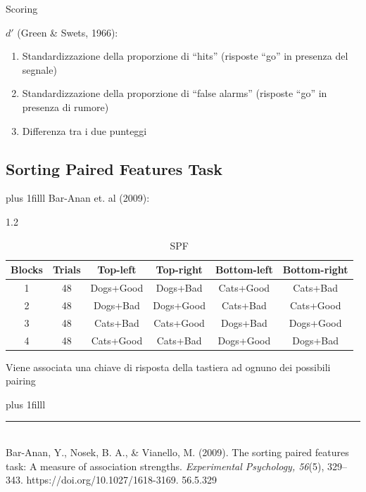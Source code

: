\documentclass[compress]{beamer}
\newcommand\Factor{1.2}
\begin{document}
\begin{frame}{Scoring}
	
$ d' $ (Green \& Swets, 1966): 

\vspace{5mm}

\begin{enumerate}
	\item Standardizzazione della proporzione di ``hits'' (risposte ``go'' in presenza del segnale)  
	\item Standardizzazione della proporzione di ``false alarms'' (risposte ``go'' in presenza di rumore)
	\item Differenza tra i due punteggi
\end{enumerate}
	
%	
\end{frame}

\subsection{Sorting Paired Features Task}
\begin{frame}
	\vskip0pt plus 1filll
	Bar-Anan et. al (2009):
	
	\begin{footnotesize}
			\begin{spacing}\Factor
			\begin{table}
				\centering
				\caption{SPF}
				\begin{tabular}{c c c c c c}
					\hline
					Blocks	&	Trials	&	Top-left	&	Top-right	&	Bottom-left	&	Bottom-right	\\
					\hline
					1	&	48	&	Dogs+Good	&	Dogs+Bad	&	Cats+Good	&	Cats+Bad	\\
					2	&	48	&	Dogs+Bad	&	Dogs+Good	&	Cats+Bad	&	Cats+Good	\\
					3	&	48	&	Cats+Bad	&	Cats+Good	&	Dogs+Bad	&	Dogs+Good	\\
					4	&	48	&	Cats+Good	&	Cats+Bad	&	Dogs+Good	&	Dogs+Bad	\\
					\hline
					
				\end{tabular}
			\end{table}
		\end{spacing}
	\end{footnotesize}

\vspace{3mm}

Viene associata una chiave di risposta della tastiera ad ognuno dei possibili pairing 

\vskip0pt plus 1filll

\color{template}\rule{0.30\linewidth}{0.5pt}\\
\color{black}
\scriptsize{Bar-Anan, Y., Nosek, B. A., \& Vianello, M. (2009).
	The sorting paired features task: A measure of
	association strengths. \emph{Experimental Psychology,
		56}(5), 329–343. https://doi.org/10.1027/1618-3169.
	56.5.329}
\end{frame}
\end{document}
